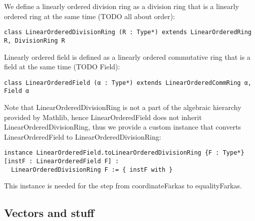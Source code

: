 \documentclass[]{article}
\renewcommand{\.}{\hskip .75pt}
\begin{document}
We define a linearly ordered division ring as a division ring that is a linearly ordered ring at the same time (TODO all about order):
\begin{lstlisting}
class LinearOrderedDivisionRing (R : Type*) extends LinearOrderedRing R, DivisionRing R
\end{lstlisting}
Linearly ordered field is defined as a linearly ordered commutative ring that is a field at the same time (TODO Field):
\begin{lstlisting}
class LinearOrderedField (α : Type*) extends LinearOrderedCommRing α, Field α
\end{lstlisting}
Note that LinearOrderedDivisionRing is not a part of the algebraic hierarchy provided by Mathlib,
hence LinearOrderedField does not inherit LinearOrderedDivisionRing, thus we provide a custom
instance that converts LinearOrderedField to LinearOrderedDivisionRing:
\begin{lstlisting}
instance LinearOrderedField.toLinearOrderedDivisionRing {F : Type*} [instF : LinearOrderedField F] :
  LinearOrderedDivisionRing F := { instF with }
\end{lstlisting}
This instance is needed for the step from coordinateFarkas to equalityFarkas.

\subsection{Vectors and stuff}
\end{document}
